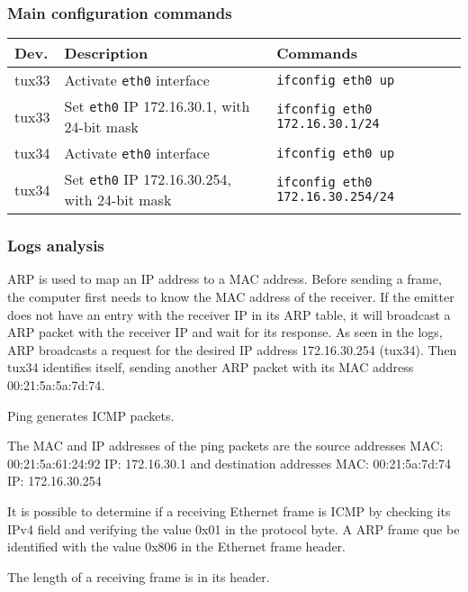 \documentclass[a4paper, 11pt]{report}
\begin{document}
\subsubsection{Main configuration commands} \label{sec:Com1}

\begin{tabular}{l | p{75mm} | l}
    \textbf{Dev.} & \textbf{Description}                                  & \textbf{Commands}                       \\ \hline
    tux33         & Activate \texttt{eth0} interface                     & \texttt{ifconfig eth0 up}               \\
    tux33         & Set \texttt{eth0} IP 172.16.30.1, with 24-bit mask   & \texttt{ifconfig eth0 172.16.30.1/24}   \\ \hline
    tux34         & Activate \texttt{eth0} interface                     & \texttt{ifconfig eth0 up}               \\
    tux34         & Set \texttt{eth0} IP 172.16.30.254, with 24-bit mask & \texttt{ifconfig eth0 172.16.30.254/24} \\
\end{tabular}

\subsubsection{Logs analysis} \label{sec:Log1}

ARP is used to map an IP address to a MAC address.
Before sending a frame, the computer first needs to know the MAC address of the receiver.
If the emitter does not have an entry with the receiver IP in its ARP table, it will broadcast a ARP packet with the receiver IP and wait for its response.
As seen in the logs, ARP broadcasts a request for the desired IP address 172.16.30.254 (tux34).
Then tux34 identifies itself, sending another ARP packet with its MAC address 00:21:5a:5a:7d:74.

Ping generates ICMP packets.

The MAC and IP addresses of the ping packets are the source addresses MAC: 00:21:5a:61:24:92 IP: 172.16.30.1
and destination addresses MAC: 00:21:5a:7d:74 IP: 172.16.30.254

It is possible to determine if a receiving Ethernet frame is ICMP by checking its IPv4 field and verifying the value 0x01 in the protocol byte.
A ARP frame que be identified with the value 0x806 in the Ethernet frame header.

The length of a receiving frame is in its header.
\end{document}
